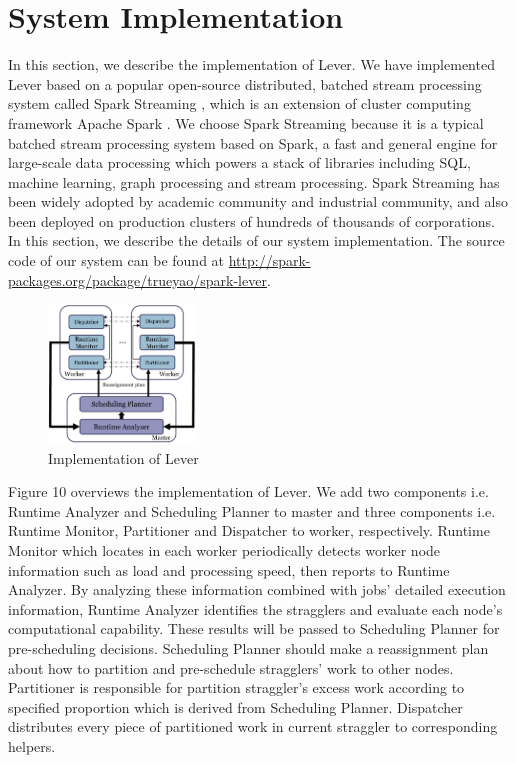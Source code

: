 \documentclass[10pt,conference,compsocconf,letterpaper]{IEEEtran}
\begin{document}
\section{System Implementation}

  In this section, we describe the implementation of Lever. We have implemented Lever based on a popular open-source distributed, batched stream processing system called Spark Streaming \cite{spark-streaming}, which is an extension of cluster computing framework Apache Spark \cite{spark}. We choose Spark Streaming because it is a typical batched stream processing system based on Spark, a fast and general engine for large-scale data processing which powers a stack of libraries including SQL, machine learning, graph processing and stream processing. Spark Streaming has been widely adopted by academic community and industrial community, and also been deployed on production clusters of hundreds of thousands of corporations. In this section, we describe the details of our system implementation. The source code of our system can be found at \url{http://spark-packages.org/package/trueyao/spark-lever}.
  \begin{figure}[htbp]
    \centering
    \includegraphics[width=0.35\textwidth]{Figure7}
    \caption{Implementation of Lever}
    \label{Fig. 10:}
  \end{figure}

  Figure 10 overviews the implementation of Lever. We add two components i.e. Runtime Analyzer and Scheduling Planner to master and three components i.e. Runtime Monitor, Partitioner and Dispatcher to worker, respectively. Runtime Monitor which locates in each worker periodically detects worker node information such as load and processing speed, then reports to Runtime Analyzer. By analyzing these information combined with jobs' detailed execution information, Runtime Analyzer identifies the stragglers and evaluate each node's computational capability. These results will be passed to Scheduling Planner for pre-scheduling decisions. Scheduling Planner should make a reassignment plan about how to partition and pre-schedule stragglers' work to other nodes. Partitioner is responsible for partition straggler's excess work according to specified proportion which is derived from Scheduling Planner. Dispatcher distributes every piece of partitioned work in current straggler to corresponding helpers.
\end{document}
